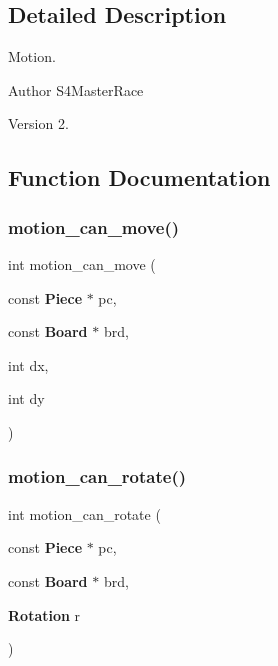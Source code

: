 \subsection{Detailed Description}
Motion. 

\begin{DoxyAuthor}{Author}
S4\+Master\+Race 
\end{DoxyAuthor}
\begin{DoxyVersion}{Version}
2. 
\end{DoxyVersion}


\subsection{Function Documentation}
\mbox{\label{motion_8c_ab199a2d7f6a562940345b4ec28e32ed2}} 
\subsubsection{motion\+\_\+can\+\_\+move()}
{\footnotesize\ttfamily int motion\+\_\+can\+\_\+move (\begin{DoxyParamCaption}\item[{const \textbf{ Piece} $\ast$}]{pc,  }\item[{const \textbf{ Board} $\ast$}]{brd,  }\item[{int}]{dx,  }\item[{int}]{dy }\end{DoxyParamCaption})}

\mbox{\label{motion_8c_ad3500291202fdc724ca7babd2df944ba}} 
\subsubsection{motion\+\_\+can\+\_\+rotate()}
{\footnotesize\ttfamily int motion\+\_\+can\+\_\+rotate (\begin{DoxyParamCaption}\item[{const \textbf{ Piece} $\ast$}]{pc,  }\item[{const \textbf{ Board} $\ast$}]{brd,  }\item[{\textbf{ Rotation}}]{r }\end{DoxyParamCaption})}

